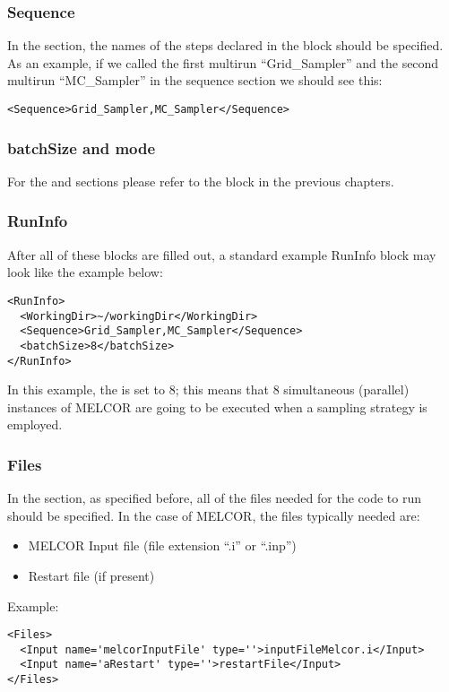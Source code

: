 \subsubsection{Sequence}
In the  section, the names of the steps declared in the
 block should be specified.
%
As an example, if we called the first multirun ``Grid\_Sampler'' and the second
multirun ``MC\_Sampler'' in the sequence section we should see this:
\begin{lstlisting}[style=XML]
<Sequence>Grid_Sampler,MC_Sampler</Sequence>
\end{lstlisting}

\subsubsection{batchSize and mode}
For the  and  sections please refer to the
 block in the previous chapters.
%
\subsubsection{RunInfo}
After all of these blocks are filled out, a standard example RunInfo block may
look like the example below:
\begin{lstlisting}[style=XML]
<RunInfo>
  <WorkingDir>~/workingDir</WorkingDir>
  <Sequence>Grid_Sampler,MC_Sampler</Sequence>
  <batchSize>8</batchSize>
</RunInfo>
\end{lstlisting}
In this example, the  is set to $8$; this means that 8 simultaneous (parallel) instances
of MELCOR are going to be executed when a sampling strategy is employed.
\subsubsection{Files}
In the  section, as specified before, all of the files needed for
the code to run should be specified.
%
In the case of MELCOR, the files typically needed are:
\begin{itemize}
  \item MELCOR Input file (file extension ``.i'' or ``.inp'')
  \item Restart file (if present)
\end{itemize}
Example:
\begin{lstlisting}[style=XML]
<Files>
  <Input name='melcorInputFile' type=''>inputFileMelcor.i</Input>
  <Input name='aRestart' type=''>restartFile</Input>
</Files>
\end{lstlisting}

